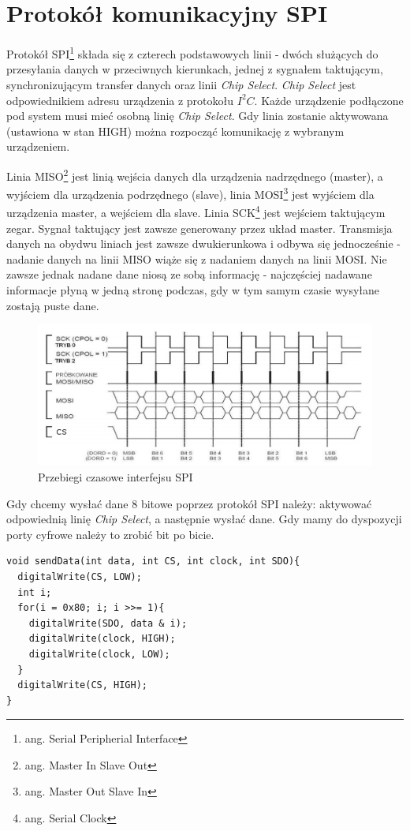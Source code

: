 \documentclass{xmgr}
\begin{document}
\section{Protokół komunikacyjny SPI}
Protokół SPI\footnote{ang. Serial Peripherial Interface} składa się z czterech podstawowych linii - dwóch służących do przesyłania danych w przeciwnych kierunkach, jednej z sygnałem taktującym, synchronizującym transfer danych oraz linii \emph{Chip Select}. \emph{Chip Select} jest odpowiednikiem adresu urządzenia z protokołu $I^2C$. Każde urządzenie podłączone pod system musi mieć osobną linię \emph{Chip Select}. Gdy linia zostanie aktywowana (ustawiona w stan HIGH) można rozpocząć komunikację z wybranym urządzeniem.

Linia MISO\footnote{ang. Master In Slave Out} jest linią wejścia danych dla urządzenia nadrzędnego (master), a wyjściem dla urządzenia podrzędnego (slave), linia MOSI\footnote{ang. Master Out Slave In} jest wyjściem dla urządzenia master, a wejściem dla slave. Linia SCK\footnote{ang. Serial Clock} jest wejściem taktującym zegar. Sygnał taktujący jest zawsze generowany przez układ master. Transmisja danych na obydwu liniach jest zawsze dwukierunkowa i odbywa się jednocześnie - nadanie danych na linii MISO wiąże się z nadaniem danych na linii MOSI. Nie zawsze jednak nadane dane niosą ze sobą informację - najczęściej nadawane informacje płyną w jedną stronę podczas, gdy w tym samym czasie wysyłane zostają puste dane.\cite{Dorra}

\begin{figure}[!h]
    \centering
    \includegraphics[height=0.25\textheight]{images/spi.png}
    \caption{Przebiegi czasowe interfejsu SPI}
\end{figure}

Gdy chcemy wysłać dane 8 bitowe poprzez protokół SPI należy: aktywować odpowiednią linię \emph{Chip Select}, a następnie wysłać dane. Gdy mamy do dyspozycji porty cyfrowe należy to zrobić bit po bicie.
\begin{lstlisting}[label=bot-dirs-alg,caption=Wysłanie danych 8 bitowych za pomocą protokołu SPI]
void sendData(int data, int CS, int clock, int SDO){
  digitalWrite(CS, LOW);
  int i;
  for(i = 0x80; i; i >>= 1){
    digitalWrite(SDO, data & i);
    digitalWrite(clock, HIGH);
    digitalWrite(clock, LOW);
  }
  digitalWrite(CS, HIGH);
}
\end{lstlisting}
\end{document}
